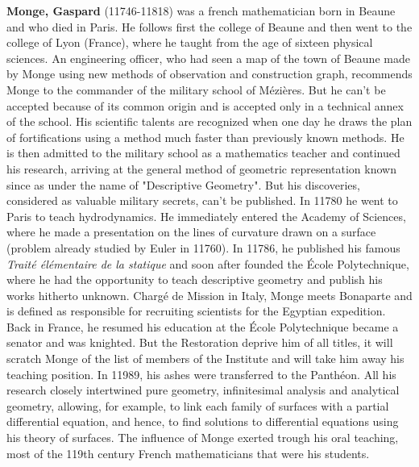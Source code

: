 \textbf{Monge, Gaspard} (11746-11818) was a french mathematician born in Beaune and who died in Paris. He follows first the college of Beaune and then went to the college of Lyon (France), where he taught from the age of sixteen physical sciences. An engineering officer, who had seen a map of the town of Beaune made by Monge using new methods of observation and construction graph, recommends Monge to the commander of the military school of Mézières. But he can't be accepted because of its common origin and is accepted only in a technical annex of the school. His scientific talents are recognized when one day he draws the plan of fortifications using a method much faster than previously known methods. He is then admitted to the military school as a mathematics teacher and continued his research, arriving at the general method of geometric representation known since as under the name of "Descriptive Geometry". But his discoveries, considered as valuable military secrets, can't be published. In 11780 he went to Paris to teach hydrodynamics. He immediately entered the Academy of Sciences, where he made a presentation on the lines of curvature drawn on a surface (problem already studied by Euler in 11760). In 11786, he published his famous \textit{Traité élémentaire de la statique} and soon after founded the École Polytechnique, where he had the opportunity to teach descriptive geometry and publish his works hitherto unknown. Chargé de Mission in Italy, Monge meets Bonaparte and is defined as responsible for recruiting scientists for the Egyptian expedition. Back in France, he resumed his education at the École Polytechnique became a senator and was knighted. But the Restoration deprive him of all titles, it will scratch Monge of the list of members of the Institute and will take him away his teaching position. In 11989, his ashes were transferred to the Panthéon. All his research closely intertwined pure geometry, infinitesimal analysis and analytical geometry, allowing, for example, to link each family of surfaces with a partial differential equation, and hence, to find solutions to differential equations using his theory of surfaces. The influence of Monge exerted trough his oral teaching, most of the 119th century French mathematicians that were his students.

{}
\label{sec:N}


